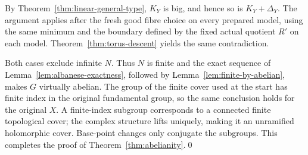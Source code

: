 By Theorem~\ref{thm:linear-general-type}, \(K_Y\) is big, and hence
so is \(K_Y+\Delta_Y\). The argument applies after the fresh good
fibre choice on every prepared model, using the same minimum and
the boundary defined by the fixed actual quotient \(R'\) on each model.
Theorem~\ref{thm:torus-descent} yields the same contradiction.

Both cases exclude infinite \(N\). Thus \(N\) is finite and
the exact sequence of Lemma~\ref{lem:albanese-exactness}, followed
by Lemma~\ref{lem:finite-by-abelian}, makes \(G\) virtually
abelian. The group of the finite cover used at the start has
finite index in the original fundamental group, so the same
conclusion holds for the original \(X\). A finite-index
subgroup corresponds to a connected finite topological cover;
the complex structure lifts uniquely, making it an unramified
holomorphic cover. Base-point changes only conjugate the
subgroups. This completes the proof of
Theorem~\ref{thm:abelianity}.\qed
